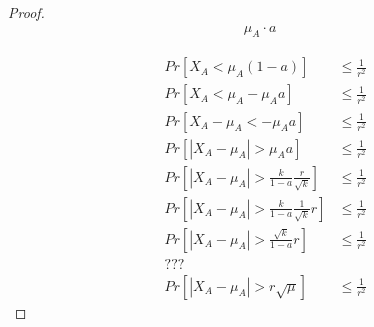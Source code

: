 
\begin{proof}

    \begin{align*}
       \mu_A \cdot a 
    \end{align*}

    \begin{align*}
        &Pr[X_A < \mu_A(1-a)] &\le \frac{1}{r^2}\\ 
        &Pr[X_A < \mu_A - \mu_A a] &\le \frac{1}{r^2}\\
        &Pr[X_A - \mu_A < - \mu_A a] &\le \frac{1}{r^2}\\
        &Pr[|X_A - \mu_A| > \mu_A a] &\le \frac{1}{r^2}\\
        &Pr[|X_A - \mu_A| > \frac{k}{1-a} \frac{r}{\sqrt{k}}]   &\le \frac{1}{r^2}\\
        &Pr[|X_A - \mu_A| > \frac{k}{1-a} \frac{1}{\sqrt{k}} r] &\le \frac{1}{r^2}\\
        &Pr[|X_A - \mu_A| > \frac{\sqrt{k}}{1-a} r]&\le \frac{1}{r^2}\\
        &???&\\
        &Pr[|X_A - \mu_A| > r \sqrt{\mu}] &\le \frac{1}{r^2}
    \end{align*}

\end{proof}

